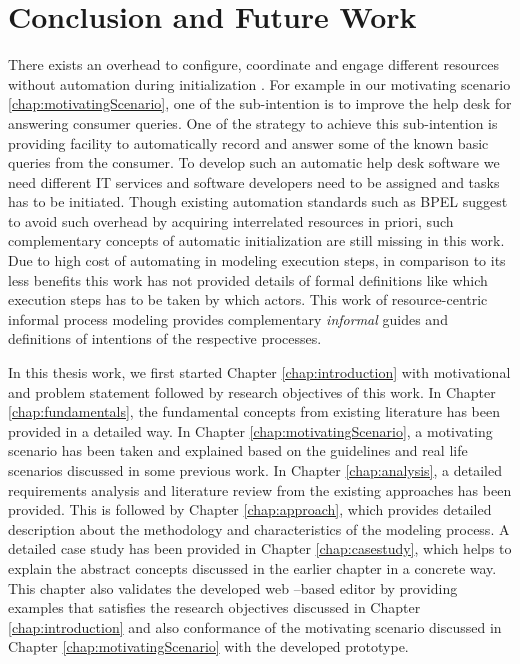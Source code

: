 \chapter{Conclusion and Future Work}
\label{chap:conclusion}

There exists an overhead to configure, coordinate and engage different resources without automation during initialization \cite{Sungur2015}. For example in our motivating scenario \ref{chap:motivatingScenario}, one of the sub-intention is to improve the help desk for answering consumer queries. One of the strategy to achieve this sub-intention is providing facility to automatically record and answer some of the known basic queries from the consumer.  To develop such an automatic help desk software we need different IT services and software developers need to be assigned and tasks has to be initiated. Though existing automation standards such as BPEL suggest to avoid such overhead by acquiring interrelated resources in priori, such complementary concepts of automatic initialization are still missing in this work. Due to high cost of automating in modeling execution steps, in comparison to its less benefits \cite{Sungur2015} this work has not provided details of  formal definitions like which execution steps has to be taken by which actors. This work of resource-centric informal process modeling provides complementary \textit{informal} guides and definitions of intentions of the respective processes. 

In this thesis work, we first started Chapter \ref{chap:introduction} with motivational and problem statement followed by research objectives of this work. In Chapter \ref{chap:fundamentals}, the fundamental concepts from existing literature has been provided in a detailed way. In Chapter \ref{chap:motivatingScenario}, a motivating scenario has been taken and explained based on the guidelines and real life scenarios discussed in some previous work. In Chapter \ref{chap:analysis}, a detailed requirements analysis and literature review from the existing approaches has been provided. This is followed by Chapter \ref{chap:approach}, which provides detailed description about the methodology and characteristics of the modeling process. A detailed case study has been provided in Chapter \ref{chap:casestudy}, which helps to explain the abstract concepts discussed in the earlier chapter in a concrete way. This chapter also validates the developed web –based editor by providing examples that satisfies the research objectives discussed in Chapter \ref{chap:introduction} and also conformance of the motivating scenario discussed in Chapter \ref{chap:motivatingScenario} with the developed prototype.

